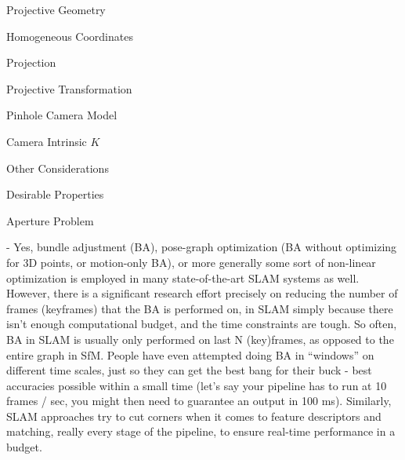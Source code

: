 \begin{section}
\begin{subsubsection}
\begin{subsubsection}
\begin{subsubsection}
\begin{section}{Projective Geometry}
\begin{subsection}{Homogeneous Coordinates}
\begin{subsubsection}
{\begin{subsubsection}{Projection}
\begin{subsubsection}{Projective Transformation}
\begin{subsection}
\begin{subsubsection}
\begin{subsubsection}
\begin{subsubsection}
{\begin{subsubsection}
\begin{subsection}
\begin{subsection} {Pinhole Camera Model}
\begin{subsection} {Camera Intrinsic $K$}
\begin{subsection}
\begin{subsection}
\begin{subsubsection}{Other Considerations}
{\begin{subsection}
\begin{subsubsection}{Desirable Properties}
\begin{section}
\begin{subsection}
\begin{subsection}
\begin{subsection}
\begin{section}
\begin{subsection}
\begin{subsubsection}
\begin{subsubsection}
\begin{subsection}
\begin{section}
\begin{subsection}
\begin{subsubsection}{Aperture Problem}
\begin{subsubsection}
{\begin{section}
\begin{subsubsection}
\begin{subsubsection}
\begin{subsubsection}
\begin{subsection}
\begin{subsection}
\begin{subsection}
\begin{subsection}
\begin{subsection}
\begin{subsection}
\begin{subsection}
\begin{subsubsection}
{- Yes, bundle adjustment (BA), pose-graph optimization (BA without optimizing for 3D points, or motion-only BA), or more generally some sort of non-linear optimization is employed in many state-of-the-art SLAM systems as well. However, there is a significant research effort precisely on reducing the number of frames (keyframes) that the BA is performed on, in SLAM simply because there isn’t enough computational budget, and the time constraints are tough. So often, BA in SLAM is usually only performed on last N (key)frames, as opposed to the entire graph in SfM. People have even attempted doing BA in “windows” on different time scales, just so they can get the best bang for their buck - best accuracies possible within a small time (let’s say your pipeline has to run at 10 frames / sec, you might then need to guarantee an output in 100 ms). Similarly, SLAM approaches try to cut corners when it comes to feature descriptors and matching, really every stage of the pipeline, to ensure real-time performance in a budget.
}
\end{subsubsection}
\end{subsection}
\end{subsection}
\end{subsection}
\end{subsection}
\end{subsection}
\end{subsection}
\end{subsection}
\end{subsubsection}
\end{subsubsection}
\end{subsubsection}
\end{section}}
\end{subsubsection}
\end{subsubsection}
\end{subsection}
\end{section}
\end{subsection}
\end{subsubsection}
\end{subsubsection}
\end{subsection}
\end{section}
\end{subsection}
\end{subsection}
\end{subsection}
\end{section}
\end{subsubsection}
\end{subsection}}
\end{subsubsection}
\end{subsection}
\end{subsection}
\end{subsection}
\end{subsection}
\end{subsection}
\end{subsubsection}}
\end{subsubsection}
\end{subsubsection}
\end{subsubsection}
\end{subsection}
\end{subsubsection}
\end{subsubsection}}
\end{subsubsection}
\end{subsection}
\end{section}
\end{subsubsection}
\end{subsubsection}
\end{subsubsection}
\end{section}
